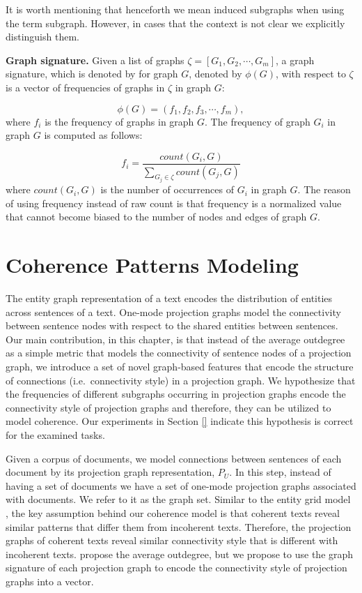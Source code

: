 It is worth mentioning that henceforth we mean induced subgraphs when using the term subgraph.  
However, in cases that the context is not clear we explicitly distinguish them.     


\textbf{Graph signature.} 
%
Given a list of graphs $ \zeta  = \left[ G_1, G_2, \cdots , G_m \right]$,  a graph signature, which is  denoted by for graph $G$, denoted by $\phi \left( G \right)$,  with respect to $\zeta$ is a vector of frequencies of graphs in $\zeta$ in graph $G$:

\begin{equation}
\phi \left( G \right) = \left( f_1, f_2, f_3, \cdots, f_m \right),
\end{equation}
%
where $f_i$ is the frequency of graphs in graph $G$. 
The frequency of graph $G_i$ in graph $G$ is computed as follows:

\begin{equation}
 f_i = \frac{count(G_i, G)}{\sum_{G_j \in \zeta}{count(G_j, G)}}
\end{equation}
%
where $count(G_i, G)$ is the number of occurrences of $G_i$ in graph $G$. 
The reason of using frequency instead of raw count is that frequency is a normalized value that cannot become biased to the number of nodes and edges of graph $G$. 



\section{Coherence Patterns Modeling}
\label{sec:coherence_patterns_modeling}
%
The entity graph representation of a text encodes the distribution of entities across sentences of a text. 
One-mode projection graphs model the connectivity between sentence nodes with respect to the shared entities between sentences. 
Our main contribution, in this chapter, is that instead of the average outdegree as a simple metric that models the connectivity of sentence nodes of a projection graph, we introduce a set of novel graph-based features that encode the structure of connections (i.e.\ connectivity style) in a projection graph. 
We hypothesize that the frequencies of different subgraphs occurring in projection graphs encode the connectivity style of  projection graphs and therefore, they can be utilized to model coherence.  
Our experiments in Section \ref{} indicate this hypothesis is correct for the examined tasks.  

Given a corpus of documents, we model connections between sentences of each document by its projection graph representation, $P_U$. 
In this step, instead of having a set of documents we have a set of one-mode projection graphs associated with documents. 
We refer to it as the graph set.  
Similar to the entity grid model \cite{barzilay08b}, the key assumption behind our coherence model is that coherent texts reveal similar patterns that differ them from incoherent texts. 
Therefore, the projection graphs of coherent texts reveal similar connectivity style that is different with incoherent texts. 
 propose the average outdegree, but we propose to use the graph signature of each projection graph to encode the connectivity style of projection graphs into a vector. 

